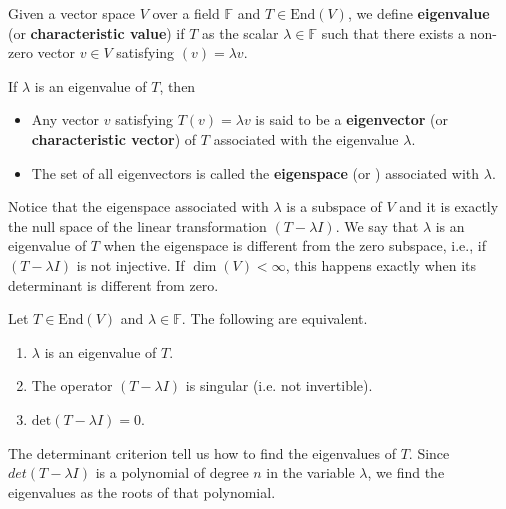 \begin{definition}
	Given a vector space $V$ over a field $\mathbb{F}$ and $T \in \text{End}(V)$, we define \textbf{eigenvalue} (or \textbf{characteristic value}) if $T$ as the scalar $\lambda \in \mathbb{F}$ such that there exists a non-zero vector $v \in V$ satisfying $(v) = \lambda v$.

	If $\lambda$ is an eigenvalue of $T$, then
	\begin{itemize}
		\item Any vector $v$ satisfying $T(v) = \lambda v$ is said to be a  \textbf{eigenvector} (or \textbf{characteristic vector}) of $T$ associated with the eigenvalue $\lambda$.
		\item The set of all eigenvectors is called the \textbf{eigenspace} (or ) associated with $\lambda$.
	\end{itemize}
\end{definition}

Notice that the eigenspace associated with $\lambda$ is a subspace of $V$ and it is exactly the null space of the linear transformation $(T - \lambda I)$. We say that $\lambda$ is an eigenvalue of $T$ when the eigenspace is different from the zero subspace, i.e., if $(T - \lambda I)$ is not injective. If $\dim(V) < \infty$, this happens exactly when its determinant is different from zero.

\begin{theorem}
	Let $T \in \text{End}(V)$  and $\lambda \in \mathbb{F}$. The following are equivalent.
	\begin{enumerate}
		\item $\lambda$ is an eigenvalue of $T$.
		\item The operator $(T- \lambda I)$ is singular (i.e. not invertible).
		\item $\text{det}(T - \lambda I) = 0$.
	\end{enumerate}
\end{theorem}

The determinant criterion tell us how to find the eigenvalues of $T$. Since $det(T - \lambda I)$ is a polynomial of degree $n$ in the variable $\lambda$, we find the eigenvalues as the roots of that polynomial.


